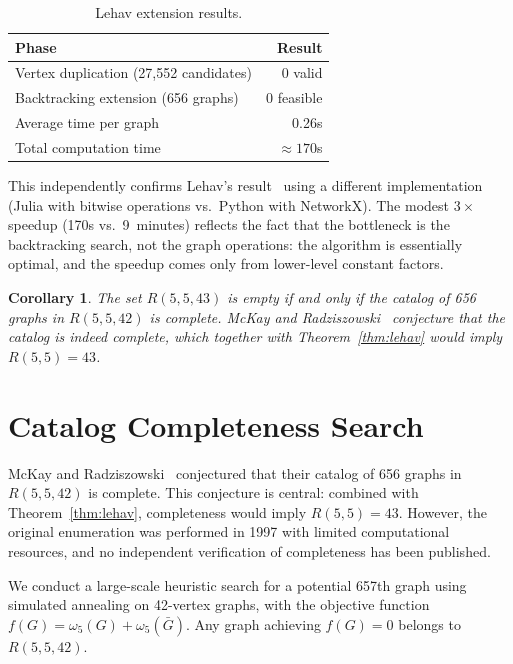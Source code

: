 \documentclass[11pt,a4paper]{article}
\newtheorem{corollary}[theorem]{Corollary}
\theoremstyle{definition}
\theoremstyle{remark}
\newcommand{\Rset}[3]{R(#1,#2,#3)}
\begin{document}
\begin{table}[h]
\centering
\begin{tabular}{lr}
\toprule
\textbf{Phase} & \textbf{Result} \\
\midrule
Vertex duplication (27{,}552 candidates) & 0 valid \\
Backtracking extension (656 graphs) & 0 feasible \\
Average time per graph & 0.26s \\
Total computation time & $\approx 170$s \\
\bottomrule
\end{tabular}
\caption{Lehav extension results.}
\label{tab:lehav}
\end{table}

This independently confirms Lehav's result~\cite{Lehav2024}
using a different implementation (Julia with bitwise operations
vs.\ Python with NetworkX).  The modest $3\times$ speedup
(170s vs.\ 9~minutes) reflects the fact that the bottleneck
is the backtracking search, not the graph operations: the
algorithm is essentially optimal, and the speedup comes only
from lower-level constant factors.

\begin{corollary}
The set $\Rset{5}{5}{43}$ is empty if and only if the catalog
of 656 graphs in $\Rset{5}{5}{42}$ is complete.
McKay and Radziszowski~\cite{McKayRadz1997} conjecture that
the catalog is indeed complete, which together with
Theorem~\ref{thm:lehav} would imply $R(5,5) = 43$.
\end{corollary}

\section{Catalog Completeness Search}
\label{sec:657th}

McKay and Radziszowski~\cite{McKayRadz1997} conjectured that their
catalog of 656 graphs in $\Rset{5}{5}{42}$ is complete.
This conjecture is central: combined with Theorem~\ref{thm:lehav},
completeness would imply $R(5,5) = 43$.
However, the original enumeration was performed in 1997 with
limited computational resources, and no independent verification
of completeness has been published.

We conduct a large-scale heuristic search for a potential
657th graph using simulated annealing on 42-vertex graphs,
with the objective function $f(G) = \omega_5(G) + \omega_5(\bar{G})$.
Any graph achieving $f(G) = 0$ belongs to $\Rset{5}{5}{42}$.
\end{document}

